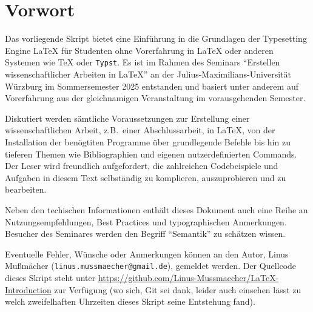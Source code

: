 \documentclass[
	11pt,
	ngerman,
]{scrbook}
\begin{document}
	\frontmatter

	

	\chapter{Vorwort}

	Das vorliegende Skript bietet eine Einführung in die Grundlagen der Typesetting Engine \LaTeX{} für Studenten ohne Vorerfahrung in \LaTeX{} oder anderen Systemen wie \TeX{} oder \texttt{Typst}.
	Es ist im Rahmen des Seminars \enquote{Erstellen wissenschaftlicher Arbeiten in \LaTeX{}} an der Julius-Maximilians-Universität Würzburg im Sommersemester 2025 entstanden und basiert unter anderem auf Vorerfahrung aus der gleichnamigen Veranstaltung im vorausgehenden Semester.

	Diskutiert werden sämtliche Voraussetzungen zur Erstellung einer wissenschaftlichen Arbeit, z.B.\ einer Abschlussarbeit, in \LaTeX{}, von der Installation der benögtiten Programme über grundlegende Befehle bis hin zu tieferen Themen wie Bibliographien und eigenen nutzerdefinierten Commands.
	Der Leser wird freundlich aufgefordert, die zahlreichen Codebeispiele und Aufgaben in diesem Text selbständig zu komplieren, auszuprobieren und zu bearbeiten.

	Neben den techischen Informationen enthält dieses Dokument auch eine Reihe an Nutzungsempfehlungen, Best Practices und typographischen Anmerkungen.
	Besucher des Seminares werden den Begriff \enquote{Semantik} zu schätzen wissen.

	Eventuelle Fehler, Wünsche oder Anmerkungen können an den Autor, Linus Mußmächer (\texttt{linus.mussmaecher@gmail.de}), gemeldet werden.
	Der Quellcode dieses Skript steht unter \url{https://github.com/Linus-Mussmaecher/LaTeX-Introduction} zur Verfügung (wo sich, Git sei dank, leider auch einsehen lässt zu welch zweifelhaften Uhrzeiten dieses Skript seine Entstehung fand).

	

	\newpage

	\setcounter{tocdepth}{1}
	\tableofcontents


	\mainmatter

	
	
	\backmatter

	\printbibliography
	
\end{document}

